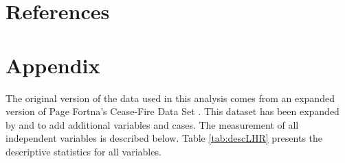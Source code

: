 \documentclass[letterpaper, 12pt]{article}
\theoremstyle{plain}
\begin{document}
\newpage
\section{References}
\printbibliography[heading = none]

\newpage
\section{Appendix}
The original version of the data used in this analysis comes from an expanded version of Page Fortna's Cease-Fire Data Set \citep{fortna2003, fortna2004b}.
This dataset has been expanded by \citet{werner2005} and \citet{lo2008} to add additional variables and cases. The measurement of all independent variables is described below. Table \ref{tab:descLHR} presents the descriptive statistics for all variables.
\end{document}
